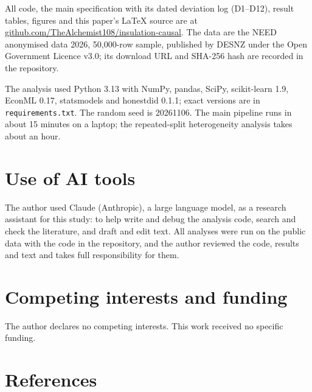 \documentclass[11pt,a4paper]{article}
\begin{document}
All code, the main specification with its dated deviation log (D1--D12), result tables, figures and this paper's LaTeX source are at \href{https://github.com/TheAlchemist108/insulation-causal}{github.com/TheAlchemist108/insulation-causal}. The data are the NEED anonymised data 2026, 50,000-row sample, published by DESNZ under the Open Government Licence v3.0; its download URL and SHA-256 hash are recorded in the repository.

The analysis used Python 3.13 with NumPy, pandas, SciPy, scikit-learn 1.9, EconML 0.17, statsmodels and honestdid 0.1.1; exact versions are in \texttt{requirements.txt}. The random seed is 20261106. The main pipeline runs in about 15 minutes on a laptop; the repeated-split heterogeneity analysis takes about an hour.

\section*{Use of AI tools}

The author used Claude (Anthropic), a large language model, as a research assistant for this study: to help write and debug the analysis code, search and check the literature, and draft and edit text. All analyses were run on the public data with the code in the repository, and the author reviewed the code, results and text and takes full responsibility for them.

\section*{Competing interests and funding}

The author declares no competing interests. This work received no specific funding.

\section*{References}
\end{document}

